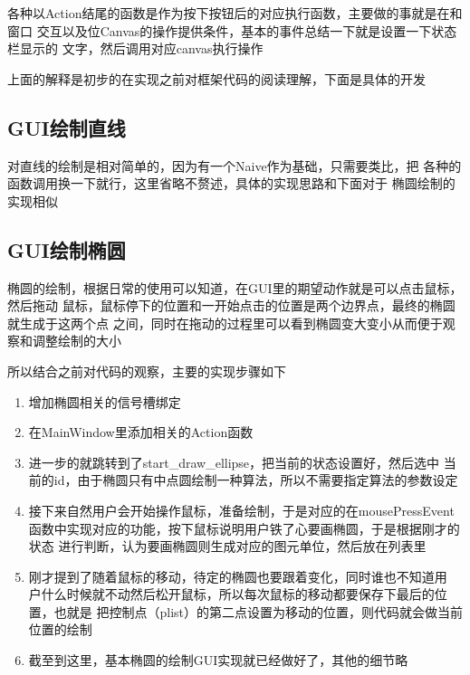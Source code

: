 \documentclass[a4paper,UTF8]{article}
\theoremstyle{definition}
\begin{document}
各种以Action结尾的函数是作为按下按钮后的对应执行函数，主要做的事就是在和窗口
交互以及位Canvas的操作提供条件，基本的事件总结一下就是设置一下状态栏显示的
文字，然后调用对应canvas执行操作



上面的解释是初步的在实现之前对框架代码的阅读理解，下面是具体的开发


\subsection{GUI绘制直线}
对直线的绘制是相对简单的，因为有一个Naive作为基础，只需要类比，把
各种的函数调用换一下就行，这里省略不赘述，具体的实现思路和下面对于
椭圆绘制的实现相似

\subsection{GUI绘制椭圆}
椭圆的绘制，根据日常的使用可以知道，在GUI里的期望动作就是可以点击鼠标，然后拖动
鼠标，鼠标停下的位置和一开始点击的位置是两个边界点，最终的椭圆就生成于这两个点
之间，同时在拖动的过程里可以看到椭圆变大变小从而便于观察和调整绘制的大小

所以结合之前对代码的观察，主要的实现步骤如下
\begin{enumerate}
    \item 增加椭圆相关的信号槽绑定
    
    \item 在MainWindow里添加相关的Action函数
    
    \item 进一步的就跳转到了start\_draw\_ellipse，把当前的状态设置好，然后选中
    当前的id，由于椭圆只有中点圆绘制一种算法，所以不需要指定算法的参数设定

    \item 接下来自然用户会开始操作鼠标，准备绘制，于是对应的在mousePressEvent
    函数中实现对应的功能，按下鼠标说明用户铁了心要画椭圆，于是根据刚才的状态
    进行判断，认为要画椭圆则生成对应的图元单位，然后放在列表里

    \item 刚才提到了随着鼠标的移动，待定的椭圆也要跟着变化，同时谁也不知道用
    户什么时候就不动然后松开鼠标，所以每次鼠标的移动都要保存下最后的位置，也就是
    把控制点（plist）的第二点设置为移动的位置，则代码就会做当前位置的绘制
    
    \item 截至到这里，基本椭圆的绘制GUI实现就已经做好了，其他的细节略
\end{enumerate}
\end{document}
